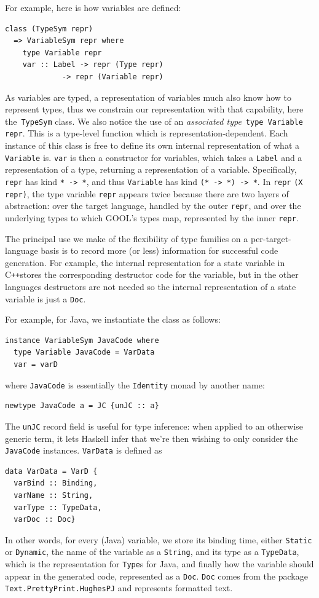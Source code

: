 \documentclass[sigplan,review,anonymous,prologue,dvipsnames]{acmart}
\newcommand{\Cplusplus}{C\texttt{++}}
\begin{document}
For example, here is how variables are defined:
\begin{lstlisting}
class (TypeSym repr)
  => VariableSym repr where
    type Variable repr
    var :: Label -> repr (Type repr)
             -> repr (Variable repr)
\end{lstlisting}
As variables are typed, a representation of variables much also know how
to represent types, thus we constrain our representation with that capability,
here the~\verb|TypeSym| class.  We also notice the use of an
\emph{associated type}~\verb|type Variable repr|. This is a type-level
function which is representation-dependent.  Each instance of this class
is free to define its own internal representation of what a
\verb|Variable| is. \verb|var| is then a constructor for variables,
which takes a \verb|Label| and a representation of a type, returning
a representation of a variable.  Specifically, \verb|repr| has kind
\verb|* -> *|, and thus \verb|Variable| has kind \verb|(* -> *) -> *|.
In \verb|repr| \verb|(X repr)|, the type variable \verb|repr| appears
twice because there are two layers of abstraction: over the target
language, handled by the outer \verb|repr|, and over the underlying
types to which GOOL's types map, represented by the inner \verb|repr|.

The principal use we make of the flexibility of type families on a
per-target-language basis is to record more (or less) information for
successful code generation. For example, the internal representation for a 
state variable in \Cplusplus stores the corresponding destructor code for the 
variable, but in the other languages destructors are not needed so the internal 
representation of a state variable is just a \verb|Doc|.

For example, for Java, we instantiate the class as follows:
\begin{lstlisting}
instance VariableSym JavaCode where
  type Variable JavaCode = VarData
  var = varD
\end{lstlisting}
where \verb|JavaCode| is essentially the \verb|Identity| monad
by another name:
\begin{lstlisting}
newtype JavaCode a = JC {unJC :: a}
\end{lstlisting}
The \verb|unJC| record field is useful for type inference: when applied to
an otherwise generic term, it lets Haskell infer that we're then wishing
to only consider the \verb|JavaCode| instances.  \verb|VarData| is defined as
\begin{lstlisting}
data VarData = VarD {
  varBind :: Binding,
  varName :: String,
  varType :: TypeData,
  varDoc :: Doc}
\end{lstlisting}
In other words, for every (Java) variable, we store its binding time, either
\verb|Static| or \verb|Dynamic|, the name of the variable as a \verb|String|,
and its type as a \verb|TypeData|, which is the representation for
\verb|Type|s for Java, and finally how the variable should appear in the
generated code, represented as a \verb|Doc|. \verb|Doc| comes from the
package \verb|Text.PrettyPrint.HughesPJ| and represents formatted text.
\end{document}
